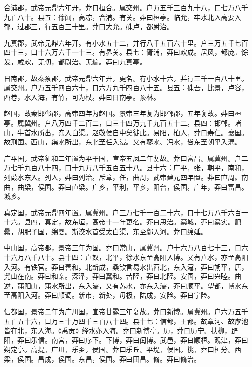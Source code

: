 \documentclass[12pt,UTF8]{ctexbook}
\begin{document}
合浦郡，武帝元鼎六年开，莽曰桓合。属交州。户万五千三百九十八，口七万八千九百八十。县五：徐闻，高凉，合浦。有关。莽曰桓亭。临允，牢水北入高要入郁，过郡三，行五百三十里。莽曰大允。硃卢，都尉治。



九真郡，武帝元鼎六年开。有小水五十二，并行八千五百六十里。户三万五千七百四十三，口十六万六千一十三。有界关。县七：胥浦，莽曰欢成。居风，都庞，馀发，咸欢，无切，都尉治。无编。莽曰九真亭。



日南郡，故秦象郡，武帝元鼎六年开，更名。有小水十六，并行三千一百八十里。属交州。户万五千四百六十，口六万九千四百八十五。县五：硃吾，比景，卢容，西卷，水入海，有竹，可为杖。莽曰日南亭。象林。



赵国，故秦邯郸郡，高帝四年为赵国。景帝三年复为邯郸郡，五年复故。莽曰桓亭。属冀州。户八万四千二百二，口三十四万九千九百五十二。县四：邯郸。堵山，牛首水所出，东入白渠。赵敬侯自中矣徙此。易阳，柏人，莽曰寿仁。襄国。故刑国。西山，渠水所出，东北至任入浸。又有蓼水、冯水，皆东至朝平入湡。



广平国，武帝征和二年置为平干国，宣帝五凤二年复故。莽曰富昌。属冀州。户二万七千九百八十四，口十九万八千五百五十八。县十六：广平，张，朝平，南和，列葭水东入。列人，莽曰列治。斥章，任，曲周，武帝建元四年置。莽曰直周。南曲，曲梁，侯国。莽曰直梁。广乡，平利，平乡，阳台，侯国。广年，莽曰富昌。城乡。



真定国，武帝元鼎四年置。属冀州。户三万七千一百二十六，口十七万八千六百一十六。县四，真定，故东垣，高帝十一年更名。莽曰思治。稾城，莽曰稾实。肥纍，胡肥子国，绵曼。斯洨水首受太白渠，东至鄡入河。莽曰绵延。



中山国，高帝郡，景帝三年为国。莽曰常山，属冀州。户十六万八百七十三，口六十六万八千八十。县十四：卢奴，北平，徐水东至高阳入博。又有卢水，亦至高阳入河。有铁官。莽曰善和。北新成，桑钦言易水出西北，东入滱，莽曰朔平，唐，尧山在南。莽曰和亲。深泽，莽曰翼和。苦陉，莽曰北陉。安国，莽曰兴睦。曲逆，蒲阳山，蒲水所出，东入濡，又有苏水，亦东入濡，莽曰顺平。望都，博水东至高阳入河。莽曰顺调。新市，新处，毋极，陆成，安险。莽曰宁险。



信都国，景帝二年为广川国，宣帝甘露三年复故。莽曰新博。属冀州。户六万五千五百五十六，口万三十万四千三百八十四。县十七：信都，王都。故章河、故虖池皆在北，东入海。《禹贡》绛水亦入海。莽曰新博亭。历，莽曰历宁。扶柳，辟阳，莽曰乐信。南宫，莽曰序下。下博，莽曰闰博。武邑，莽曰顺桓。观津，莽曰朔定亭。高提，广川，乐乡，侯国。莽曰乐丘。平堤，侯国。桃，莽曰桓分。西梁，侯国。昌成，侯国。东昌，侯国。莽曰田昌。脩。莽曰脩治。
\end{document}
